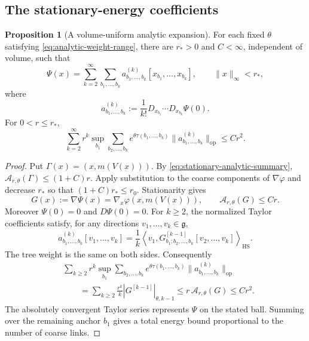 \documentclass[10pt,reqno]{amsart}
\theoremstyle{definition}
\newtheorem{proposition}[definition]{Proposition}
\theoremstyle{remark}
\numberwithin{equation}{section}
\numberwithin{figure}{section}
\newcommand{\g}{\mathfrak g}
\begin{document}
\subsection{The stationary-energy coefficients}
\begin{proposition}[A volume-uniform analytic expansion]\label{prop:stationary-energy-analytic}
For each fixed $\theta$ satisfying \eqref{eq:analytic-weight-range},
there are $r_*>0$ and $C<\infty$, independent of volume, such that
\begin{equation}\label{eq:stationary-energy-series}
\Psi(x)=\sum_{k=2}^\infty\sum_{b_1,\ldots,b_k}
a^{(k)}_{b_1,\ldots,b_k}[x_{b_1},\ldots,x_{b_k}],\qquad
\|x\|_\infty<r_*,
\end{equation}
where
\begin{equation}\label{eq:stationary-energy-taylor-coefficients}
a^{(k)}_{b_1,\ldots,b_k}
:=\frac1{k!}D_{x_{b_1}}\cdots D_{x_{b_k}}\Psi(0).
\end{equation}
For $0<r\le r_*$,
\begin{equation}\label{eq:stationary-energy-weighted-coefficients}
\boxed{\sum_{k=2}^\infty r^k\sup_{b_1}\sum_{b_2,\ldots,b_k}
e^{\theta\tau(b_1,\ldots,b_k)}
\|a^{(k)}_{b_1,\ldots,b_k}\|_{\mathrm{op}}\le Cr^2.}
\end{equation}
\end{proposition}
\begin{proof}
Put $\Gamma(x)=(x,m(V(x)))$. By
\eqref{eq:stationary-analytic-summary},
$\mathcal A_{r,\theta}(\Gamma)\le(1+C)r$.
Apply substitution to the coarse components of $\nabla\varphi$ and
decrease $r_*$ so that $(1+C)r_*\le r_0$. Stationarity gives
\begin{equation}\label{eq:stationary-gradient-analytic-bound}
G(x):=\nabla\Psi(x)=\nabla_x\varphi(x,m(V(x))),\qquad
\mathcal A_{r,\theta}(G)\le Cr.
\end{equation}
Moreover $\Psi(0)=0$ and $D\Psi(0)=0$.
For $k\ge2$, the normalized Taylor coefficients satisfy, for any
directions $v_1,\ldots,v_k\in\g$,
\begin{equation}\label{eq:energy-gradient-coefficient-relation}
a^{(k)}_{b_1,\ldots,b_k}[v_1,\ldots,v_k]
=\frac1k\left\langle v_1,
G^{[k-1]}_{b_1;b_2,\ldots,b_k}[v_2,\ldots,v_k]
\right\rangle_{\mathrm{HS}}.
\end{equation}
The tree weight is the same on both sides. Consequently
\begin{equation}\label{eq:energy-coefficient-sum-calculation}
\begin{aligned}
&\sum_{k\ge2}r^k\sup_{b_1}\sum_{b_2,\ldots,b_k}
e^{\theta\tau(b_1,\ldots,b_k)}
\|a^{(k)}_{b_1,\ldots,b_k}\|_{\mathrm{op}}\\
&\qquad=\sum_{k\ge2}\frac{r^k}{k}|G^{[k-1]}|_{\theta,k-1}
\le r\,\mathcal A_{r,\theta}(G)\le Cr^2.
\end{aligned}
\end{equation}
The absolutely convergent Taylor series represents $\Psi$ on the
stated ball. Summing over the remaining anchor $b_1$ gives a total
energy bound proportional to the number of coarse links.
\end{proof}
\end{document}
